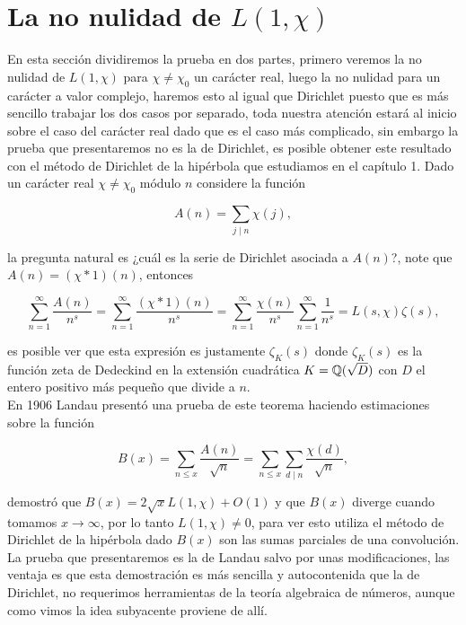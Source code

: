 \section{La no nulidad de \texorpdfstring{$L(1,\chi)$}{Lg}}

En esta sección dividiremos la prueba en dos partes, primero veremos la no nulidad de $L(1,\chi)$ para $\chi\neq\chi_0$ un carácter real, luego la no nulidad para un carácter a valor complejo, haremos esto al igual que Dirichlet puesto que es más sencillo trabajar los dos casos por separado, toda nuestra atención estará al inicio sobre el caso del carácter real dado que es el caso más complicado, sin embargo la prueba que presentaremos no es la de Dirichlet, es posible obtener este resultado con el método de Dirichlet de la hipérbola que estudiamos en el capítulo 1. Dado un carácter real $\chi\neq\chi_0$ módulo $n$ considere la función

$$A(n)=\sum_{j\mid n}\chi(j),$$

la  pregunta natural es ¿cuál es la serie de Dirichlet asociada a $A(n)$?, note que $A(n)=(\chi*1)(n)$, entonces

$$\sum_{n=1}^{\infty} \frac{A(n)}{n^s}=\sum_{n=1}^{\infty} \frac{(\chi*1)(n)}{n^s}=\sum_{n=1}^{\infty} \frac{\chi(n)}{n^s}\sum_{n=1}^{\infty} \frac{1}{n^s}=L(s,\chi)\zeta(s),$$

es posible ver que esta expresión es justamente $\zeta_K(s)$ donde $\zeta_K(s)$ es la función zeta de Dedeckind en la extensión cuadrática $K=\mathbb{Q}(\sqrt{D})$ con $D$ el entero positivo más pequeño que divide a $n$.\\

En 1906 Landau presentó una prueba de este teorema haciendo estimaciones sobre la función 

$$B(x)=\sum_{n\leq x}\frac{A(n)}{\sqrt{n}}=\sum_{n\leq x}\sum_{d\mid n}\frac{\chi(d)}{\sqrt{n} },$$

demostró que $B(x)=2 \sqrt{x}L(1,\chi)+O(1)$ y que $B(x)$ diverge cuando tomamos $x\to\infty$, por lo tanto $L(1,\chi)\neq 0$, para ver esto utiliza el método de Dirichlet de la hipérbola dado $B(x)$ son las sumas parciales de una convolución. La prueba que presentaremos es la de Landau salvo por unas modificaciones, las ventaja es que esta demostración es más sencilla y autocontenida que la de Dirichlet, no requerimos herramientas de la teoría algebraica de números, aunque como vimos la idea subyacente proviene de allí.